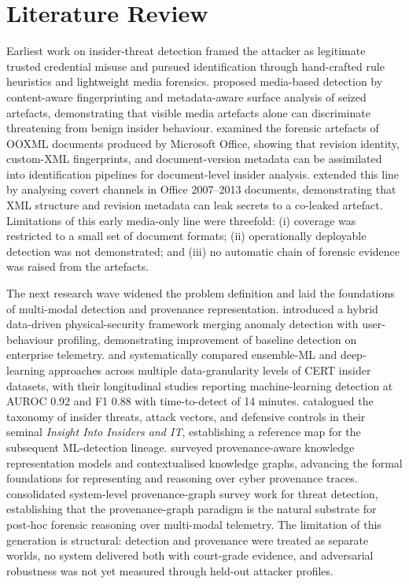 \section{Literature Review}
\label{sec:lit_review}

Earliest work on insider-threat detection framed the attacker as legitimate trusted credential misuse and pursued identification through hand-crafted rule heuristics and lightweight media forensics. \citet{garfinkel2013detecting} proposed media-based detection by content-aware fingerprinting and metadata-aware surface analysis of seized artefacts, demonstrating that visible media artefacts alone can discriminate threatening from benign insider behaviour. \citet{didriksen2014ooxml} examined the forensic artefacts of OOXML documents produced by Microsoft Office, showing that revision identity, custom-XML fingerprints, and document-version metadata can be assimilated into identification pipelines for document-level insider analysis. \citet{fu2015docx} extended this line by analysing covert channels in Office 2007--2013 documents, demonstrating that XML structure and revision metadata can leak secrets to a co-leaked artefact. Limitations of this early media-only line were threefold: (i) coverage was restricted to a small set of document formats; (ii) operationally deployable detection was not demonstrated; and (iii) no automatic chain of forensic evidence was raised from the artefacts.

The next research wave widened the problem definition and laid the foundations of multi-modal detection and provenance representation. \citet{mavroeidis2018framework} introduced a hybrid data-driven physical-security framework merging anomaly detection with user-behaviour profiling, demonstrating improvement of baseline detection on enterprise telemetry. \citet{le2019machine} and \citet{le2020analyzing} systematically compared ensemble-ML and deep-learning approaches across multiple data-granularity levels of CERT insider datasets, with their longitudinal studies reporting machine-learning detection at AUROC 0.92 and F1 0.88 with time-to-detect of 14 minutes. \citet{homoliak2018insight} catalogued the taxonomy of insider threats, attack vectors, and defensive controls in their seminal \textit{Insight Into Insiders and IT}, establishing a reference map for the subsequent ML-detection lineage. \citet{sikos2020provenance} surveyed provenance-aware knowledge representation models and contextualised knowledge graphs, advancing the formal foundations for representing and reasoning over cyber provenance traces. \citet{li2021threat} consolidated system-level provenance-graph survey work for threat detection, establishing that the provenance-graph paradigm is the natural substrate for post-hoc forensic reasoning over multi-modal telemetry. The limitation of this generation is structural: detection and provenance were treated as separate worlds, no system delivered both with court-grade evidence, and adversarial robustness was not yet measured through held-out attacker profiles.

